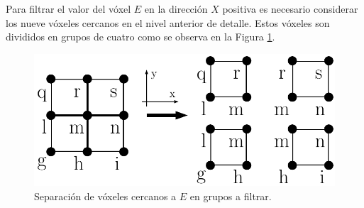 Para filtrar el valor del vóxel $E$ en la dirección $X$ positiva es necesario considerar los nueve vóxeles cercanos en el nivel anterior de detalle. Estos vóxeles son divididos en grupos de cuatro como se observa en la Figura \ref{fig:filter_groups}.

\begin{figure}[H]
    \centering
    \includegraphics[width=.5\linewidth]{media/filtering_2.pdf}
    \caption{Separación de vóxeles cercanos a $E$ en grupos a filtrar.}
    \label{fig:filter_groups}
\end{figure}


